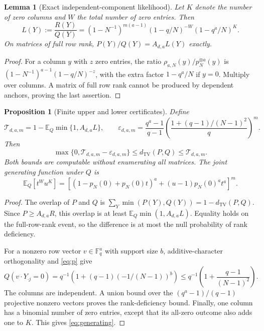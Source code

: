 \documentclass[11pt]{article}
\newtheorem{proposition}[theorem]{Proposition}
\newtheorem{lemma}[theorem]{Lemma}
\theoremstyle{remark}\newtheorem{remark}[theorem]{Remark}
\newcommand{\F}{\mathbb F_q}
\newcommand{\E}{\mathbb E}
\newcommand{\TV}{d_{\mathrm{TV}}}
\begin{document}
\begin{lemma}[Exact independent-component likelihood]\label{lem:L}
Let $K$ denote the number of zero columns and $W$ the total number of zero entries. Then
\begin{equation}\label{eq:L}
 L(Y):=\frac{R(Y)}{Q(Y)}
 =(1-N^{-1})^{m(a-1)}(1-q/N)^{-W}(1-q^a/N)^K.
\end{equation}
On matrices of full row rank, $P(Y)/Q(Y)=A_{d,a}L(Y)$ exactly.
\end{lemma}

\begin{proof}
For a column $y$ with $z$ zero entries, the ratio $\rho_{a,N}(y)/p_N^{\otimes a}(y)$ is $(1-N^{-1})^{a-1}(1-q/N)^{-z}$, with the extra factor $1-q^a/N$ if $y=0$. Multiply over columns. A matrix of full row rank cannot be produced by dependent anchors, proving the last assertion.
\end{proof}

\begin{proposition}[Finite upper and lower certificates]\label{prop:finite}
Define
\[
 \mathcal T_{d,a,m}=1-\E_Q\min\{1,A_{d,a}L\},\qquad
 \varepsilon_{d,a,m}=\frac{q^a-1}{q-1}
 \left(\frac{1+(q-1)/(N-1)^2}{q}\right)^m.
\]
Then
\begin{equation}\label{eq:finite-bound}
 \max\{0,\mathcal T_{d,a,m}-\varepsilon_{d,a,m}\}
 \le \TV(P,Q)\le\mathcal T_{d,a,m}.
\end{equation}
Both bounds are computable without enumerating all matrices. The joint generating function under $Q$ is
\begin{equation}\label{eq:generating}
 \E_Q[t^Wu^K]=
 \left[(1-p_N(0)+p_N(0)t)^a+(u-1)p_N(0)^at^a\right]^m.
\end{equation}
\end{proposition}

\begin{proof}
The overlap of $P$ and $Q$ is $\sum_Y\min(P(Y),Q(Y))=1-\TV(P,Q)$. Since $P\ge A_{d,a}R$, this overlap is at least $\E_Q\min(1,A_{d,a}L)$. Equality holds on the full-row-rank event, so the difference is at most the null probability of rank deficiency.

For a nonzero row vector $v\in\F^a$ with support size $b$, additive-character orthogonality and \eqref{eq:p} give
\[
 Q(v\cdot Y_{\cdot j}=0)
 =q^{-1}\left(1+(q-1)(-1/(N-1))^b\right)
 \le q^{-1}\left(1+\frac{q-1}{(N-1)^2}\right).
\]
The columns are independent. A union bound over the $(q^a-1)/(q-1)$ projective nonzero vectors proves the rank-deficiency bound. Finally, one column has a binomial number of zero entries, except that its all-zero outcome also adds one to $K$. This gives \eqref{eq:generating}.
\end{proof}
\end{document}
